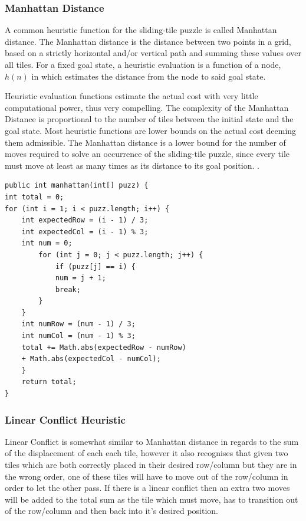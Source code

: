 \documentclass[progress]{cmpreport}
\begin{document}
\subsubsection{Manhattan Distance}
A common heuristic function for the sliding-tile puzzle is called Manhattan distance. The Manhattan distance is the distance between two points in a grid, based on a strictly horizontal and/or vertical path and summing these values over all tiles. For a fixed goal state, a heuristic evaluation is a function of a node, $h(n)$ in which estimates the distance from the node to said goal state.


Heuristic evaluation functions estimate the actual cost with very little computational power, thus very compelling. The complexity of the Manhattan Distance is proportional to the number of tiles between the initial state and the goal state. Most heuristic functions are lower bounds on the actual cost deeming them admissible. The Manhattan distance is a lower bound for the number of moves required to solve an occurrence of the sliding-tile puzzle, since every tile must move at least as many times as its distance to its goal position. \citep{DBLP:conf/ccgrid/LinnertSB14}.

\begin{verbatim}
public int manhattan(int[] puzz) {
int total = 0;
for (int i = 1; i < puzz.length; i++) {
    int expectedRow = (i - 1) / 3;
    int expectedCol = (i - 1) % 3;
    int num = 0;
        for (int j = 0; j < puzz.length; j++) {
            if (puzz[j] == i) {
            num = j + 1;
            break;
        }    
    }
    int numRow = (num - 1) / 3;
    int numCol = (num - 1) % 3;
    total += Math.abs(expectedRow - numRow)
    + Math.abs(expectedCol - numCol);
    }
    return total;
}
\end{verbatim}
\subsubsection{Linear Conflict Heuristic}
Linear Conflict is somewhat similar to Manhattan distance in regards to the sum of the displacement of each each tile, however it also recognises that given two tiles which are both correctly placed in their desired row/column but they are in the wrong order, one of these tiles will have to move out of the row/column in order to let the other pass. If there is a linear conflict then an extra two moves will be added to the total sum as the tile which must move, has to transition out of the row/column and then back into it's desired position.
\end{document}
